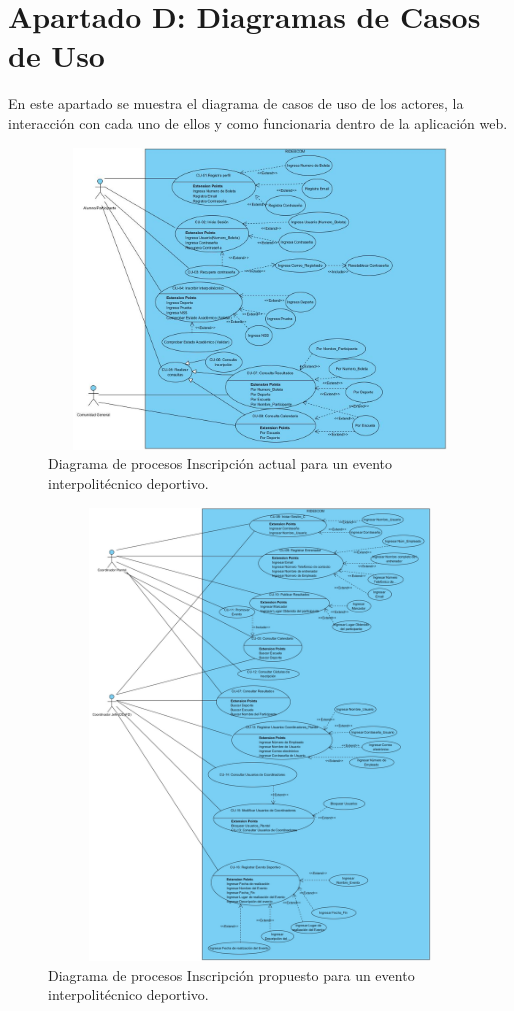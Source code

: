 	
	\chapter{Apartado D: Diagramas de Casos de Uso}
	\noindent En este apartado se muestra el diagrama de casos de uso de los actores, la interacción con cada uno de ellos y como funcionaria dentro de la aplicación web.
		\begin{figure}[hbt!]
			\centering
			\includegraphics[width=16cm, height=8cm]{Imagenes/Disenos/DiagramasCU/Alumno.jpg}
			\caption{Diagrama de procesos Inscripción actual para un evento interpolitécnico deportivo.}
			\label{Inscripcion}
		\end{figure}
	\pagebreak
		\begin{figure}[hbt!]
			\centering
			\includegraphics[width=16cm, height=12cm]{Imagenes/Disenos/DiagramasCU/CoordinadoresFinal.jpg}
			\caption{Diagrama de procesos Inscripción propuesto para un evento interpolitécnico deportivo.}
			\label{Inscripcion}
		\end{figure}
	
